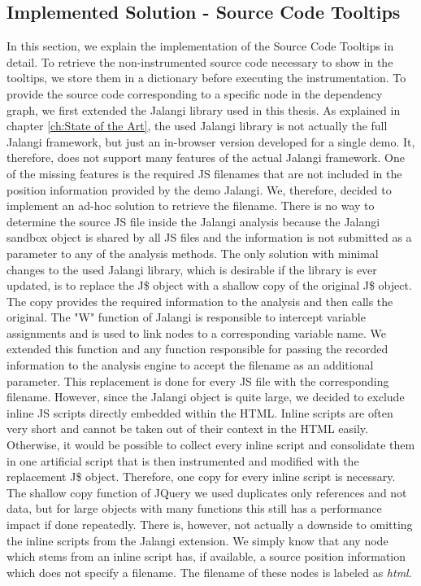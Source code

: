 \subsection{Implemented Solution - Source Code Tooltips}
In this section, we explain the implementation of the Source Code Tooltips in detail. To retrieve the non-instrumented source code necessary to show in the tooltips, we store them in a dictionary before executing the instrumentation. To provide the source code corresponding to a specific node in the dependency graph, we first extended the Jalangi library used in this thesis. As explained in chapter \ref{ch:State of the Art}, the used Jalangi library is not actually the full Jalangi framework, but just an in-browser version developed for a single demo. It, therefore, does not support many features of the actual Jalangi framework. One of the missing features is the required JS filenames that are not included in the position information provided by the demo Jalangi. We, therefore, decided to implement an ad-hoc solution to retrieve the filename. There is no way to determine the source JS file inside the Jalangi analysis because the Jalangi sandbox object is shared by all JS files and the information is not submitted as a parameter to any of the analysis methods. The only solution with minimal changes to the used Jalangi library, which is desirable if the library is ever updated, is to replace the J\$ object with a shallow copy of the original J\$ object. The copy provides the required information to the analysis and then calls the original. The "W" function of Jalangi is responsible to intercept variable assignments and is used to link nodes to a corresponding variable name. We extended this function and any function responsible for passing the recorded information to the analysis engine to accept the filename as an additional parameter. This replacement is done for every JS file with the corresponding filename. However, since the Jalangi object is quite large, we decided to exclude inline JS scripts directly embedded within the HTML. Inline scripts are often very short and cannot be taken out of their context in the HTML easily. Otherwise, it would be possible to collect every inline script and consolidate them in one artificial script that is then instrumented and modified with the replacement J\$ object. Therefore, one copy for every inline script is necessary. The shallow copy function of JQuery we used duplicates only references and not data, but for large objects with many functions this still has a performance impact if done repeatedly. There is, however, not actually a downside to omitting the inline scripts from the Jalangi extension. We simply know that any node which stems from an inline script has, if available, a source position information which does not specify a filename. The filename of these nodes is labeled as \emph{html}.\\
